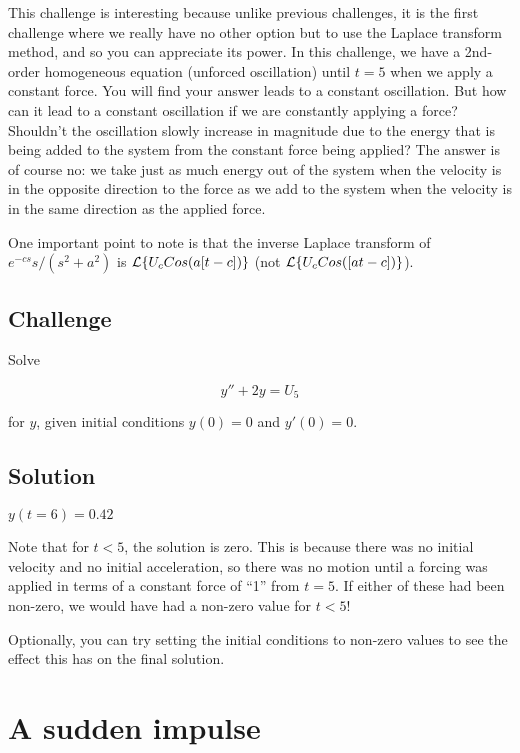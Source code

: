 This challenge is interesting because unlike previous challenges, it is the first challenge where we really have no other option but to use the Laplace transform method, and so you can appreciate its power. In this challenge, we have a 2nd-order homogeneous equation (unforced oscillation) until $t=5$ when we apply a constant force. You will find your answer leads to a constant oscillation. But how can it lead to a constant oscillation if we are constantly applying a force? Shouldn't the oscillation slowly increase in magnitude due to the energy that is being added to the system from the constant force being applied? The answer is of course no: we take just as much energy out of the system when the velocity is in the opposite direction to the force as we add to the system when the velocity is in the same direction as the applied force.

One important point to note is that the inverse Laplace transform of $e^{-cs} s/(s^2+a^2)$ is $\mathcal{L}\{U_c Cos(a[t-c])\}$ (not $\mathcal{L}\{U_c Cos([at-c])\}$).

\subsection*{Challenge}
Solve

\begin{equation}
    y''+2y=U_5
\end{equation}

for $y$, given initial conditions $y(0)=0$ and $y'(0)=0$. 

\subsection*{Solution}

$y(t=6)=0.42$

Note that for $t<5$, the solution is zero. This is because there was no initial velocity and no initial acceleration, so there was no motion until a forcing was applied in terms of a constant force of ``1'' from $t=5$. If either of these had been non-zero, we would have had a non-zero value for $t<5$!

Optionally, you can try setting the initial conditions to non-zero values to see the effect this has on the final solution.




\newpage
\section{A sudden impulse}

